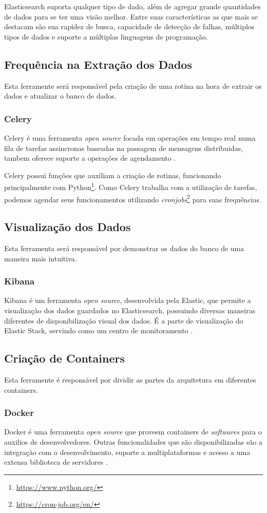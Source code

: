 Elasticsearch suporta qualquer tipo de dado, além de agregar grande quantidades de dados para se ter uma visão melhor. Entre suas características as que mais se destacam são sua rapidez de busca, capacidade de detecção de falhas, múltiplos tipos de dados e suporte a múltiplas linguagens de programação.
\subsection{Frequência na Extração dos Dados}
Esta ferramente será responsável pela criação de uma rotina na hora de extrair os dados e atualizar o banco de dados.
\subsubsection*{Celery}
Celery é uma ferramenta \textit{open source} focada em operações em tempo real numa fila de tarefas assincronas baseadas na passagem de mensagens distribuidas, tambem oferece suporte a operações de agendamento \cite{celery}.

Celery possui funções que auxiliam a criação de rotinas, funcionando principalmente com Python\footnote[2]{\url{https://www.python.org/}}. Como Celery trabalha com a utilização de tarefas, podemos agendar seus funcionamentos utilizando \textit{cronjobs}\footnote[3]{\url{https://cron-job.org/en/}} para suas frequências.
\subsection{Visualização dos Dados}
Esta ferramenta será responsável por demonstrar os dados do banco de uma maneira mais intuitiva.
\subsubsection*{Kibana}
Kibana é um ferramenta \textit{open source}, desenvolvida pela Elastic, que permite a visualização dos dados guardados no Elasticsearch, possuindo diversas maneiras diferentes de disponibilização visual dos dados. É a parte de visualização do Elastic Stack, servindo como um centro de monitoramento \cite{kibana}.

\subsection{Criação de Containers}
Esta ferramente é responsável por dividir as partes da arquitetura em diferentes containers.
\subsubsection*{Docker}
Docker é uma ferramenta \textit{open source} que proveem containers de \textit{softwares} para o auxilios de desenvolvedores. Outras funcionalidades que são disponibilizadas são a integração com o desenvolvimento, suporte a multiplataformas e acesso a uma extensa biblioteca de servidores \cite{docker}.

